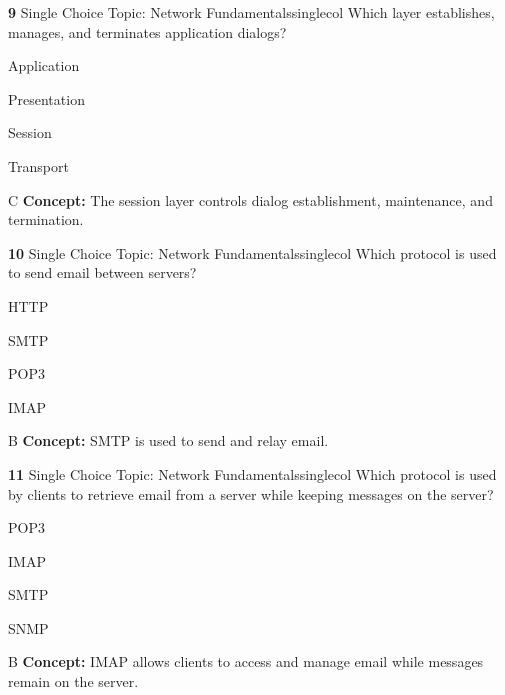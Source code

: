 \documentclass[10pt,a4paper]{article}
\begin{document}
\begin{qcard}{\color{white}\textbf{9} \hfill \small Single Choice \textbar{} Topic: Network Fundamentals}{singlecol}
Which layer establishes, manages, and terminates application dialogs?

\begin{qoptions}
\item Application
\item Presentation
\item Session
\item Transport
\end{qoptions}
\begin{explainbox}{C}
\textbf{Concept:} The session layer controls dialog establishment, maintenance, and termination.
\end{explainbox}
\end{qcard}

\begin{qcard}{\color{white}\textbf{10} \hfill \small Single Choice \textbar{} Topic: Network Fundamentals}{singlecol}
Which protocol is used to send email between servers?

\begin{qoptions}
\item HTTP
\item SMTP
\item POP3
\item IMAP
\end{qoptions}
\begin{explainbox}{B}
\textbf{Concept:} SMTP is used to send and relay email.
\end{explainbox}
\end{qcard}

\begin{qcard}{\color{white}\textbf{11} \hfill \small Single Choice \textbar{} Topic: Network Fundamentals}{singlecol}
Which protocol is used by clients to retrieve email from a server while keeping messages on the server?

\begin{qoptions}
\item POP3
\item IMAP
\item SMTP
\item SNMP
\end{qoptions}
\begin{explainbox}{B}
\textbf{Concept:} IMAP allows clients to access and manage email while messages remain on the server.
\end{explainbox}
\end{qcard}
\end{document}
